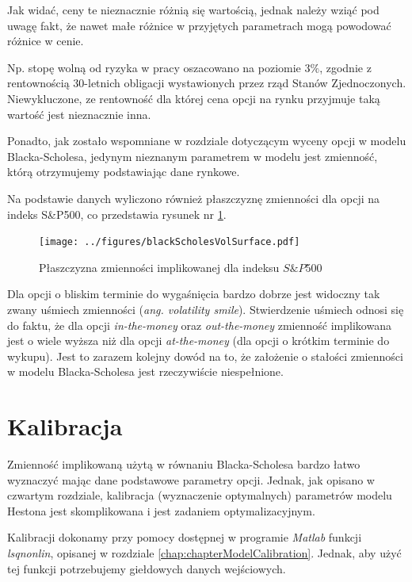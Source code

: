 \documentclass{pracamgr}
\begin{document}
Jak widać, ceny te nieznacznie różnią się wartością, jednak należy wziąć pod uwagę fakt, że nawet 
małe różnice w przyjętych parametrach mogą powodować różnice w cenie. 

Np. stopę wolną od ryzyka w pracy oszacowano na poziomie 3$\%$, zgodnie z rentownością 30-letnich 
obligacji wystawionych przez rząd Stanów Zjednoczonych. Niewykluczone, ze rentowność dla której cena 
opcji na rynku przyjmuje taką wartość jest nieznacznie inna.

Ponadto, jak zostało wspomniane w rozdziale dotyczącym wyceny opcji w modelu Blacka-Scholesa,
jedynym nieznanym parametrem w modelu jest zmienność, którą otrzymujemy podstawiając
dane rynkowe. 

Na podstawie danych wyliczono również płaszczyznę zmienności dla 
opcji na indeks S\&P500, co przedstawia rysunek nr \ref{fig:volatilitySurface}. 

\begin{figure}
  \centering
  \texttt{[image: ../figures/blackScholesVolSurface.pdf]}
  \caption{Płaszczyzna zmienności implikowanej dla indeksu $S\&P$500}
  \label{fig:volatilitySurface}
\end{figure}

Dla opcji o bliskim terminie do wygaśnięcia bardzo dobrze jest widoczny
tak zwany uśmiech zmienności (\textit{ang. volatility smile}). Stwierdzenie uśmiech 
odnosi się do faktu, że dla opcji \textit{in-the-money} oraz \textit{out-the-money}
zmienność implikowana jest o wiele wyższa niż dla opcji \textit{at-the-money} (dla opcji o krótkim
terminie do wykupu).
Jest to zarazem kolejny dowód na to, że założenie o stałości zmienności w modelu Blacka-Scholesa jest 
rzeczywiście niespełnione.


\section{Kalibracja}

Zmienność implikowaną użytą w równaniu Blacka-Scholesa 
bardzo łatwo wyznaczyć mając dane podstawowe parametry 
opcji. Jednak, jak opisano w czwartym rozdziale, 
kalibracja (wyznaczenie optymalnych) parametrów modelu Hestona jest skomplikowana i jest
zadaniem optymalizacyjnym.  

Kalibracji dokonamy przy pomocy dostępnej w programie \textit{Matlab} funkcji \textit{lsqnonlin}, 
opisanej w rozdziale \ref{chap:chapterModelCalibration}.
Jednak, aby użyć tej funkcji potrzebujemy giełdowych danych wejściowych.
\end{document}
